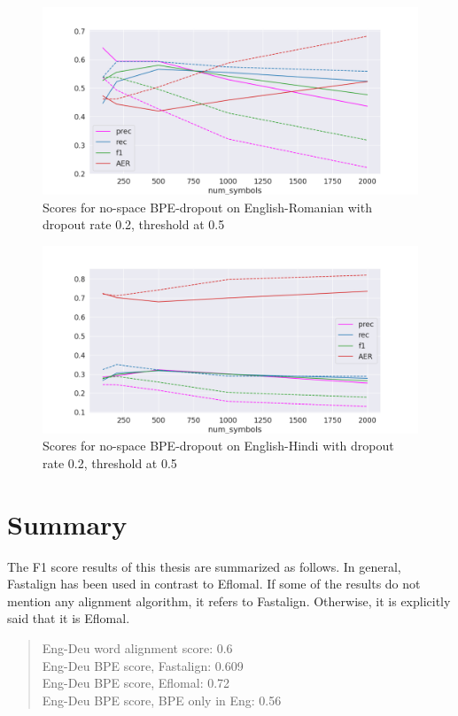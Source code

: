 \begin{figure}[!ht]
    \centering
    \includegraphics[width=13cm]{../reports/scores_dropout_bpe/no space/0.2/eng_ron_ns_0.5_thres_fastalign.png}
    \caption{Scores for no-space BPE-dropout on English-Romanian with dropout rate 0.2, threshold at 0.5}
\end{figure}

\begin{figure}[!ht]
    \centering
    \includegraphics[width=13cm]{../reports/scores_dropout_bpe/no space/0.2/eng_hin_ns_0.5_thres_fastalign.png}
    \caption{Scores for no-space BPE-dropout on English-Hindi with dropout rate 0.2, threshold at 0.5}
\end{figure}

\clearpage
\section{Summary}

The F1 score results of this thesis are summarized as follows. In general, Fastalign has been used in contrast to Eflomal. If some of the results do not mention any alignment algorithm, it refers to Fastalign. Otherwise, it is explicitly said that it is Eflomal.

\begin{quote}
    Eng-Deu word alignment score: 0.6\\
    Eng-Deu BPE score, Fastalign: 0.609\\
    Eng-Deu BPE score, Eflomal: 0.72\\
    Eng-Deu BPE score, BPE only in Eng: 0.56
\end{quote}


